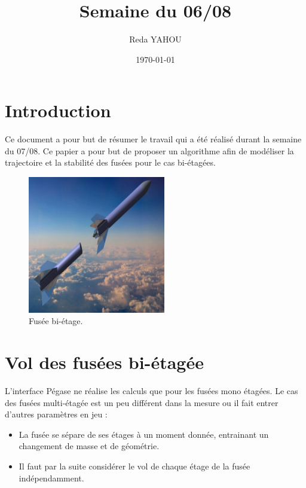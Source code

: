 \documentclass[a4paper]{article}
\title{Semaine du 06/08}
\author{Reda YAHOU}
\date{\today}
\begin{document}
\maketitle

\section*{Introduction}

Ce document a pour but de résumer le travail qui a été réalisé durant la semaine du 07/08. Ce papier a pour but de proposer un algorithme afin de modéliser la trajectoire et la stabilité des fusées pour le cas bi-étagées.\\




\begin{figure}[!htbp]
\begin{center}
\includegraphics[width=6cm]{pictures/complet-1024x494.jpg} 
\end{center}
\caption{Fusée bi-étage.}
\end{figure}





\section{Vol des fusées bi-étagée}

L'interface Pégase ne réalise les calculs que pour les fusées mono étagées. Le cas des fusées multi-étagée est un peu différent dans la mesure ou il fait entrer d'autres paramètres en jeu : \\

\begin{itemize}
\item La fusée se sépare de ses étages à un moment donnée, entrainant un changement de masse et de géométrie.
\item Il faut par la suite considérer le vol de chaque étage de la fusée indépendamment.
\end{itemize}
\end{document}
